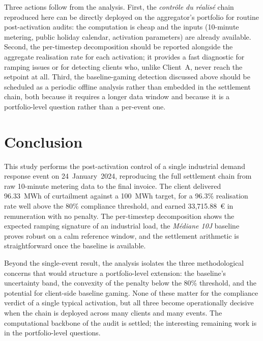 \documentclass{article}
\begin{document}
Three actions follow from the analysis. First, the \textit{contr\^ole du r\'ealis\'e} chain reproduced here can be directly deployed on the aggregator's portfolio for routine post-activation audits: the computation is cheap and the inputs (10-minute metering, public holiday calendar, activation parameters) are already available. Second, the per-timestep decomposition should be reported alongside the aggregate realisation rate for each activation; it provides a fast diagnostic for ramping issues or for detecting clients who, unlike Client~A, never reach the setpoint at all. Third, the baseline-gaming detection discussed above should be scheduled as a periodic offline analysis rather than embedded in the settlement chain, both because it requires a longer data window and because it is a portfolio-level question rather than a per-event one.

\section{Conclusion}

This study performs the post-activation control of a single industrial demand response event on 24~January~2024, reproducing the full settlement chain from raw 10-minute metering data to the final invoice. The client delivered 96.33~MWh of curtailment against a 100~MWh target, for a 96.3\% realisation rate well above the 80\% compliance threshold, and earned 33{,}715.88~\euro{} in remuneration with no penalty. The per-timestep decomposition shows the expected ramping signature of an industrial load, the \textit{M\'ediane 10J} baseline proves robust on a calm reference window, and the settlement arithmetic is straightforward once the baseline is available.

Beyond the single-event result, the analysis isolates the three methodological concerns that would structure a portfolio-level extension: the baseline's uncertainty band, the convexity of the penalty below the 80\% threshold, and the potential for client-side baseline gaming. None of these matter for the compliance verdict of a single typical activation, but all three become operationally decisive when the chain is deployed across many clients and many events. The computational backbone of the audit is settled; the interesting remaining work is in the portfolio-level questions.

\balance
\end{document}
